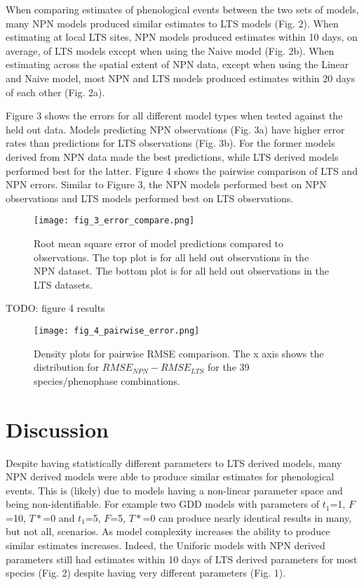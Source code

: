 \documentclass[fleqn,10pt,lineno]{wlpeerj} %
\begin{document}
When comparing estimates of phenological events between the two sets of models, many NPN models produced similar estimates to LTS models (Fig. 2). When estimating at local LTS sites, NPN models produced estimates within 10 days, on average, of LTS models except when using the Naive model (Fig. 2b). When estimating across the spatial extent of NPN data, except when using the Linear and Naive model, most NPN and LTS models produced estimates within 20 days of each other (Fig. 2a). 

Figure 3 shows the errors for all different model types when tested against the held out data. Models predicting NPN observations (Fig. 3a) have higher error rates than predictions for LTS observations (Fig. 3b). For the former models derived from NPN data made the best predictions, while LTS derived models performed best for the latter. Figure 4 shows the pairwise comparison of LTS and NPN errors. Similar to Figure 3, the NPN models performed best on NPN observations and LTS models performed best on LTS observations.

\begin{figure}
	\centering
		\texttt{[image: fig\_3\_error\_compare.png]}
	\caption{Root mean square error of model predictions compared to observations. The top plot is for all held out observations in the NPN dataset. The bottom plot is for all held out observations in the LTS datasets.}
\end{figure}

TODO: figure 4 results

\begin{figure}
	\centering
		\texttt{[image: fig\_4\_pairwise\_error.png]}
	\caption{Density plots for pairwise RMSE comparison. The x axis shows the distribution for $RMSE_{NPN} - RMSE_{LTS}$  for the  39 species/phenophase combinations.}
\end{figure}


\section*{Discussion}

Despite having statistically different parameters to LTS derived models, many NPN derived models were able to produce similar estimates for phenological events. This is (likely) due to models having a non-linear parameter space and being non-identifiable. For example two GDD models with parameters of $t_{1}$=1, $F$=10, $T*$=0 and $t_{1}$=5, $F$=5, $T*$=0 can produce nearly identical results in many, but not all, scenarios. As model complexity increases the ability to produce similar estimates increases. Indeed, the Uniforic models with NPN derived parameters still had estimates within 10 days of LTS derived parameters for most species (Fig. 2) despite having very different parameters (Fig. 1). 
\end{document}
